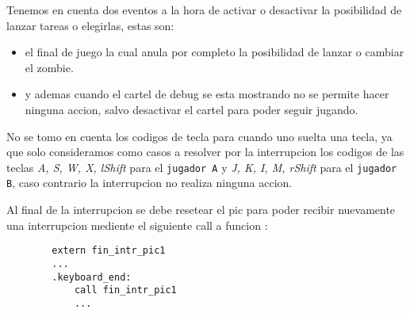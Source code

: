 	Tenemos en cuenta dos eventos a la hora de activar o desactivar la posibilidad de lanzar tareas o elegirlas, estas son: 
	\begin{itemize}
		\item{el final de juego la cual anula por completo la posibilidad de lanzar o cambiar el zombie.}

		\item{y ademas cuando el cartel de debug se esta mostrando no se permite hacer ninguna accion, salvo desactivar el cartel para poder seguir jugando.}
	\end{itemize}

	No se tomo en cuenta los codigos de tecla para cuando uno suelta una tecla, ya que solo consideramos como casos a resolver por la interrupcion los codigos de las teclas \textit{A, S, W, X, lShift} para el \texttt{jugador A} y \textit{J, K, I, M, rShift} para el \texttt{jugador B}, caso contrario la interrupcion no realiza ninguna accion.

	Al final de la interrupcion se debe resetear el pic para poder recibir nuevamente una interrupcion mediente el siguiente call a funcion :

	\begin{lstlisting}
		extern fin_intr_pic1
		...
   		.keyboard_end:
    		call fin_intr_pic1
    		...	
	\end{lstlisting}
